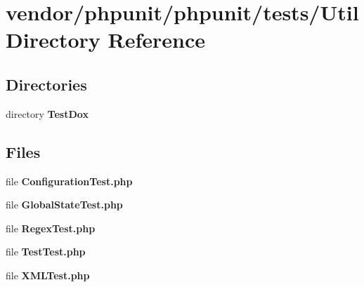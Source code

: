 \section{vendor/phpunit/phpunit/tests/\+Util Directory Reference}
\label{dir_bec34971a862d1186bd8666cfb970311}
\subsection*{Directories}
\begin{DoxyCompactItemize}
\item 
directory {\bf Test\+Dox}
\end{DoxyCompactItemize}
\subsection*{Files}
\begin{DoxyCompactItemize}
\item 
file {\bf Configuration\+Test.\+php}
\item 
file {\bf Global\+State\+Test.\+php}
\item 
file {\bf Regex\+Test.\+php}
\item 
file {\bf Test\+Test.\+php}
\item 
file {\bf X\+M\+L\+Test.\+php}
\end{DoxyCompactItemize}
